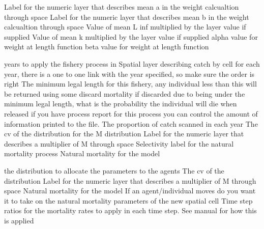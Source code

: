 {Label for the numeric layer that describes mean a in the weight calcualtion through space}
 {Label for the numeric layer that describes mean b in the weight calcualtion through space}
 {Value of mean L inf multiplied by the layer value if supplied}
 {Value of mean k multiplied by the layer value if supplied}
 {alpha value for weight at length function}
 {beta value for weight at length function}
 {}
 {}
\par\textbf{}\par
\par\textbf{}\par
{} {years to apply the fishery process in}
 {Spatial layer describing catch by cell for each year, there is a one to one link with the year specified, so make sure the order is right}
 {The minimum legal length for this fishery, any individual less than this will be returned using some discard mortality}
 {if discarded due to being under the minimum legal length, what is the probability the individual will die when released}
 {if you have process report for this process you can control the amount of information printed to the file.}
 {The proportion of catch scanned in each year}
 {The cv of the distribution for the M distribution}
 {Label for the numeric layer that describes a multiplier of M through space}
 {Selectivity label for the natural mortality process}
 {Natural mortality for the model}
\par\textbf{}\par
{} {the distribution to allocate the parameters to the agents}
 {The cv of the distribution}
 {Label for the numeric layer that describes a multiplier of M through space}
 {Natural mortality for the model}
 {If an agent/individual moves do you want it to take on the natural mortality parameters of the new spatial cell}
 {Time step ratios for the mortality rates to apply in each time step. See manual for how this is applied}

